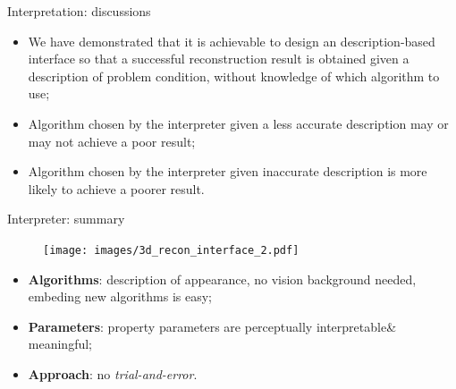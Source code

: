 \documentclass[10pt]{beamer}
\begin{document}
\begin{frame}{Interpretation: discussions}

\begin{exampleblock}{}
\begin{itemize}
\item We have demonstrated that it is achievable to design an description-based interface so that a successful reconstruction result is obtained given a description of problem condition, without knowledge of which algorithm to use;
\item Algorithm chosen by the interpreter given a less accurate description may or may not achieve a poor result;
\item Algorithm chosen by the interpreter given inaccurate description is more likely to achieve a poorer result.
\end{itemize}
\end{exampleblock}

\end{frame}

\begin{frame}{Interpreter: summary}

\begin{figure}
\centering
\texttt{[image: images/3d\_recon\_interface\_2.pdf]}
\end{figure}

\begin{exampleblock}{}
  \begin{itemize}
    \item \textbf{Algorithms}: description of appearance, no vision background needed, embeding new algorithms is easy;
    \item \textbf{Parameters}: property parameters are perceptually interpretable\& meaningful;
    \item \textbf{Approach}: no \textit{trial-and-error}.
  \end{itemize}
\end{exampleblock}

\end{frame}

\end{document}
